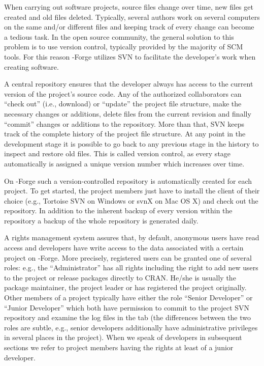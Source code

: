 When carrying out software projects, source files change over time,
new files get created and old files deleted. Typically, several authors
work on several computers on the same and/or different files and keeping
track of every change can become a tedious task. In the open source
community, the general solution to this problem is to use version
control, typically
provided by the majority of SCM tools. For this reason \R{}-Forge
utilizes SVN to facilitate the developer's work when creating
software.

A central repository ensures that the developer
always has access to the current version of the project's source
code. Any of the authorized collaborators can ``check out''
(i.e., download) or ``update'' the project
file structure, make the necessary changes or additions, delete
files from the current revision and finally ``commit'' changes or
additions to the repository. More than
that, SVN keeps track of the complete history of the project file
structure. At any point in the development stage it is possible to go
back to any previous stage in the history to inspect and restore old
files. This is called version control, as every stage automatically is
assigned a unique version number which increases over time.

On \R{}-Forge such a version-controlled repository is automatically
created for each project. To get started, the project members just
have to install the client of their choice (e.g., Tortoise SVN on
Windows or svnX on
Mac OS X) and check out the repository. In addition to the inherent
backup of every version within the repository a backup of the whole
repository is generated daily.

A rights management system assures that, by default, anonymous users
have read access and developers have write access to the data associated with
a certain project on \R{}-Forge. More precisely, registered users can
be granted one of several roles: e.g., the ``Administrator'' has
all rights including the right to
add new users to the project or release packages directly to CRAN.
He/she is usually the package
maintainer, the project leader or has registered the project originally.
Other members of a project typically have either the role ``Senior
Developer'' or ``Junior Developer'' which both have permission to
commit to the project SVN repository and examine the log files in the
 tab (the differences between the two
roles are subtle, e.g., senior developers additionally have administrative
privileges in several places in the project).
When we speak of developers in subsequent sections we refer to project
members having the rights at least of a junior developer.


